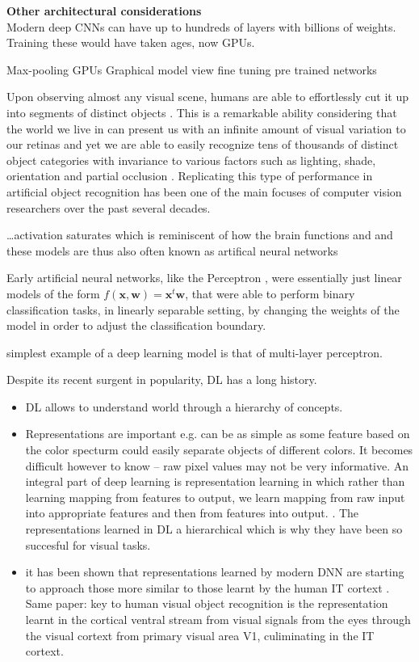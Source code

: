 \documentclass{report}
\begin{document}
\textbf{Other architectural considerations}\\
Modern deep CNNs can have up to hundreds of layers with billions of weights. Training these would have taken ages, now GPUs.




Max-pooling 
GPUs
Graphical model view
fine tuning 
pre trained networks


Upon observing almost any visual scene, humans are able to effortlessly cut it up into segments of distinct objects \cite{Rosch1976}. This is a remarkable ability considering that the world we live in can present us with an infinite amount of visual variation to our retinas and yet we are able to easily recognize tens of thousands of distinct object categories \cite{Biederman1989} with invariance to various factors such as lighting, shade, orientation and partial occlusion \cite{DiCarlo2012}. Replicating this type of performance in artificial object recognition has been one of the main focuses of computer vision researchers over the past several decades.


\dots activation saturates which is reminiscent of how the brain functions and and these models are thus also often known as artifical neural networks \cite{Goodfellow2016}

Early artificial neural networks, like the Perceptron \cite{Rosenblatt1958}, were essentially just linear models of the form $f(\mathbf{x}, \mathbf{w}) = \mathbf{x}^t \mathbf{w}$, that were able to perform binary classification tasks, in linearly separable setting, by changing the weights of the model in order to adjust the classification boundary. 

simplest example of a deep learning model is that of multi-layer perceptron. 


Despite its recent surgent in popularity, DL has a long history.




\begin{itemize}
    \item DL allows to understand world through a hierarchy of concepts. 
    \item Representations are important e.g. can be as simple as some feature based on the color specturm could easily separate objects of different colors. It becomes difficult however to know -- raw pixel values may not be very informative. An integral part of deep learning is representation learning in which rather than learning mapping from features to output, we learn mapping from raw input into appropriate features and then from features into output. \cite{Goodfellow2016}. The representations learned in DL a hierarchical which is why they have been so succesful for visual tasks.
    \item it has been shown that representations learned by modern DNN are starting to approach those more similar to those learnt by the human IT cortext \cite{Cadieu2014}. Same paper: key to human visual object recognition is the representation learnt in the cortical ventral stream from visual signals from the eyes through the visual cortext from primary visual area V1, culiminating in the IT cortext. 
\end{itemize}



\end{document}
